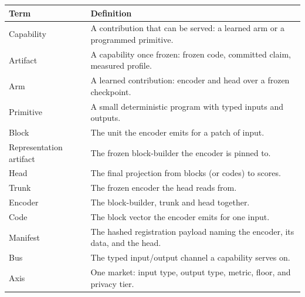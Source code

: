 \documentclass[11pt]{article}
\begin{document}
\begin{center}
    \begin{tabular}{@{}p{3.2cm}p{11.0cm}@{}}
        \toprule
        \textbf{Term}           & \textbf{Definition}                                     \\
        \midrule
        Capability              & A contribution that can be served: a learned arm or a
        programmed primitive.                                                             \\
        Artifact                & A capability once frozen: frozen code, committed claim,
        measured profile.                                                                 \\
        Arm                     & A learned contribution: encoder and head over a frozen
        checkpoint.                                                                       \\
        Primitive               & A small deterministic program with typed inputs and
        outputs.                                                                          \\
        Block                   & The unit the encoder emits for a patch of input.        \\
        Representation artifact & The frozen block-builder the encoder is
        pinned to.                                                                        \\
        Head                    & The final projection from blocks (or codes) to scores.  \\
        Trunk                   & The frozen encoder the head reads from.                 \\
        Encoder                 & The block-builder, trunk and head together.             \\
        Code                    & The block vector the encoder emits for one input.       \\
        Manifest                & The hashed registration payload naming the encoder,
        its data, and the head.                                                           \\
        Bus                     & The typed input/output channel a capability serves on.  \\
        Axis                    & One market: input type, output type, metric, floor, and
        privacy tier.                                                                     \\

\end{tabular}
\end{center}
\end{document}
